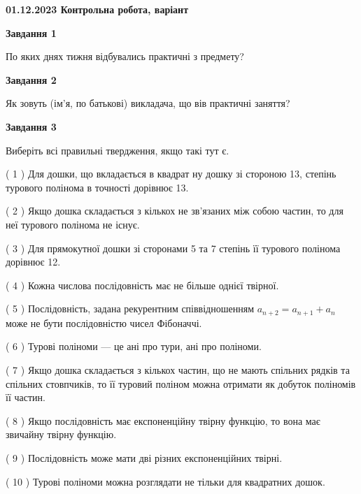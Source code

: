 \documentclass[12pt, ukrainian]{article}
\begin{document}
\begin {large}

\textbf{01.12.2023 Контрольна робота, варіант  }\par


{
{\begin {center}\textbf{Завдання 1}\end {center}}\par
По яких днях тижня відбувались практичні з предмету?\par
{\begin {center}\textbf{Завдання 2}\end {center}}\par
Як зовуть (ім'я, по батькові) викладача, що вів практичні заняття?\par
{\begin {center}\textbf{Завдання 3}\end {center}}\par
Виберіть всі правильні твердження, якщо такі тут є.\par
\vspace{2mm}
( 1 ) Для дошки, що вкладається в квадрат ну дошку зі стороною 13, степінь турового полінома в точності дорівнює 13.%

( 2 ) Якщо дошка складається з кількох не зв’язаних між собою частин, то для неї турового полінома не існує.%

( 3 ) Для прямокутної дошки зі сторонами 5 та 7 степінь її турового полінома дорівнює 12.%

( 4 ) Кожна числова послідовність має не більше однієї твірної.%

( 5 ) Послідовність, задана рекурентним співвідношенням $a_{n+2}=a_{n+1}+a_{n}$ може не бути послідовністю чисел Фібоначчі.%

( 6 ) Турові поліноми --- це ані про тури, ані про поліноми.%

( 7 ) Якщо дошка складається з кількох частин, що не мають спільних рядків та спільних стовпчиків, то її туровий поліном можна отримати як добуток поліномів її частин.%

( 8 ) Якщо послідовність має експоненційну твірну функцію, то вона має звичайну твірну функцію.%

( 9 ) Послідовність може мати дві різних експоненційних твірні.%

( 10 ) Турові поліноми можна розглядати не тільки для квадратних дошок.%
}
\end {large}

\vspace{4mm}
\newpage
\end{document}
